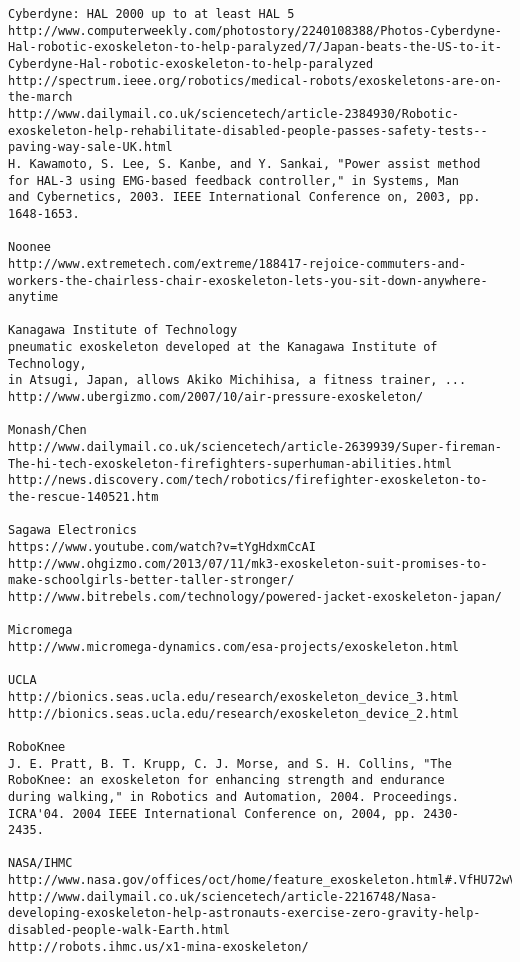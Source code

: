 \documentclass[letterpaper,12pt,fullpage]{article}
\begin{document}
\begin{verbatim}
Cyberdyne: HAL 2000 up to at least HAL 5
http://www.computerweekly.com/photostory/2240108388/Photos-Cyberdyne-Hal-robotic-exoskeleton-to-help-paralyzed/7/Japan-beats-the-US-to-it-Cyberdyne-Hal-robotic-exoskeleton-to-help-paralyzed
http://spectrum.ieee.org/robotics/medical-robots/exoskeletons-are-on-the-march
http://www.dailymail.co.uk/sciencetech/article-2384930/Robotic-exoskeleton-help-rehabilitate-disabled-people-passes-safety-tests--paving-way-sale-UK.html
H. Kawamoto, S. Lee, S. Kanbe, and Y. Sankai, "Power assist method
for HAL-3 using EMG-based feedback controller," in Systems, Man
and Cybernetics, 2003. IEEE International Conference on, 2003, pp.
1648-1653.

Noonee
http://www.extremetech.com/extreme/188417-rejoice-commuters-and-workers-the-chairless-chair-exoskeleton-lets-you-sit-down-anywhere-anytime

Kanagawa Institute of Technology
pneumatic exoskeleton developed at the Kanagawa Institute of Technology,
in Atsugi, Japan, allows Akiko Michihisa, a fitness trainer, ...
http://www.ubergizmo.com/2007/10/air-pressure-exoskeleton/

Monash/Chen
http://www.dailymail.co.uk/sciencetech/article-2639939/Super-fireman-The-hi-tech-exoskeleton-firefighters-superhuman-abilities.html
http://news.discovery.com/tech/robotics/firefighter-exoskeleton-to-the-rescue-140521.htm

Sagawa Electronics
https://www.youtube.com/watch?v=tYgHdxmCcAI
http://www.ohgizmo.com/2013/07/11/mk3-exoskeleton-suit-promises-to-make-schoolgirls-better-taller-stronger/
http://www.bitrebels.com/technology/powered-jacket-exoskeleton-japan/

Micromega
http://www.micromega-dynamics.com/esa-projects/exoskeleton.html

UCLA
http://bionics.seas.ucla.edu/research/exoskeleton_device_3.html
http://bionics.seas.ucla.edu/research/exoskeleton_device_2.html

RoboKnee
J. E. Pratt, B. T. Krupp, C. J. Morse, and S. H. Collins, "The
RoboKnee: an exoskeleton for enhancing strength and endurance
during walking," in Robotics and Automation, 2004. Proceedings.
ICRA'04. 2004 IEEE International Conference on, 2004, pp. 2430-
2435.

NASA/IHMC
http://www.nasa.gov/offices/oct/home/feature_exoskeleton.html#.VfHU72wVhBc
http://www.dailymail.co.uk/sciencetech/article-2216748/Nasa-developing-exoskeleton-help-astronauts-exercise-zero-gravity-help-disabled-people-walk-Earth.html
http://robots.ihmc.us/x1-mina-exoskeleton/


\end{verbatim}
\end{document}
